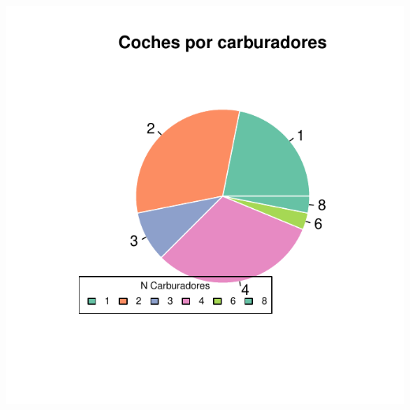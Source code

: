 \documentclass{article}\usepackage[]{graphicx}\usepackage[]{color}
\makeatletter
\def\maxwidth{ %
  \ifdim\Gin@nat@width>\linewidth
    \linewidth
  \else
    \Gin@nat@width
  \fi
}
\newenvironment{knitrout}{}{} %
\makeatother
\begin{document}
\begin{knitrout}
\color{fgcolor}

{\centering \includegraphics[width=\maxwidth]{figure/plot_pie_basic-1} 

}



\end{knitrout}
\clearpage
\end{document}

